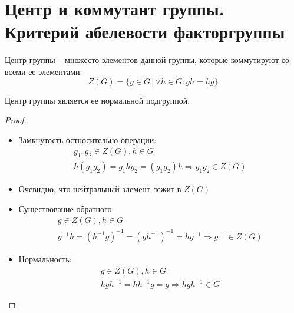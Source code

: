 \section{Центр и коммутант группы. Критерий абелевости факторгруппы}
\begin{conj}
    Центр группы -- множесто элементов данной группы, которые коммутируют со всеми ее элементами:
    \[ Z(G) = \{ g \in G \, | \, \forall h \in G : gh = hg \} \]
\end{conj}

\begin{theorem-non}
    Центр группы является ее нормальной подгруппой.
\end{theorem-non}
\begin{proof} \quad \\
    \begin{itemize}
        \item Замкнутость остносительно операции: 
        \begin{gather*}
            g_1, g_2 \in Z(G), h \in G \\
            h(g_1g_2) = g_1hg_2 = (g_1g_2)h \Rightarrow g_1g_2 \in Z(G)
        \end{gather*}
        \item Очевидно, что нейтральный элемент лежит в $Z(G)$
        \item Существование обратного:
        \begin{gather*}
            g \in Z(G), h \in G \\
            g^{-1}h = (h^{-1}g)^{-1} = (gh^{-1})^{-1} = hg^{-1} \Rightarrow g^{-1} \in Z(G)
        \end{gather*}
        \item Нормальность:
        \begin{gather*}
            g \in Z(G), h \in G \\
            hgh^{-1} = hh^{-1}g = g \Rightarrow hgh^{-1} \in G
        \end{gather*}
    \end{itemize}
\end{proof}

